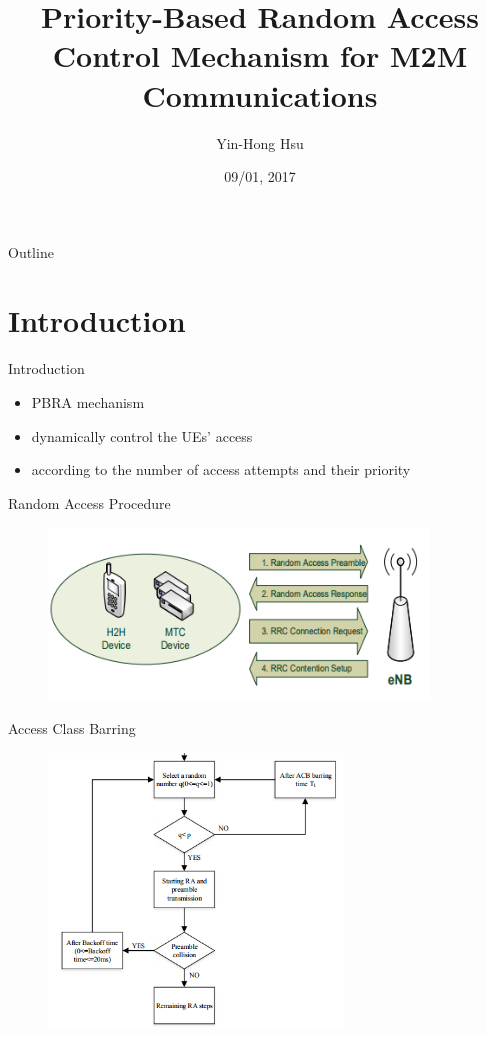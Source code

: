 \documentclass{beamer}
\title {
    Priority-Based Random Access Control Mechanism for M2M Communications \cite{Guan16}
}
\author {
    Yin-Hong Hsu
}
\date {
    09/01, 2017 %
}
\begin{document}
\begin{frame}
    \titlepage
\end{frame}

\begin{frame}{Outline}
    \tableofcontentsgather
    \tableofcontents
\end{frame}

\section{Introduction}
\begin{frame}{Introduction}
\begin{itemize}
    \item {{PBRA} mechanism}
    \item {dynamically control the UEs' access}
    \item {according to the number of access attempts and their priority}
\end{itemize}
\end{frame}
\begin{frame}{Random Access Procedure}
\begin{figure}[t]
    \centering
    \includegraphics[width=0.9\textwidth]{figures/rap.png}
\end{figure}
\end{frame}
\begin{frame}{Access Class Barring}
\begin{figure}[t]
    \centering
    \includegraphics[width=0.7\textwidth]{figures/acb.png}
\end{figure}
\end{frame}
\end{document}
